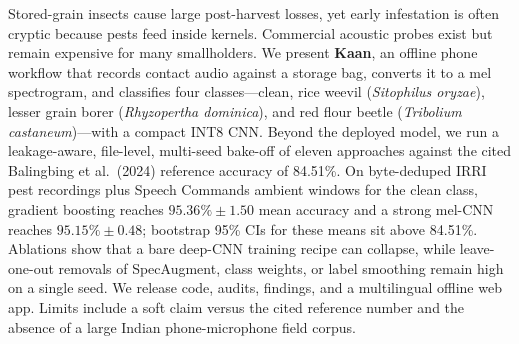 Stored-grain insects cause large post-harvest losses, yet early infestation is often cryptic because pests feed inside kernels.
Commercial acoustic probes exist but remain expensive for many smallholders.
We present \textbf{Kaan}, an offline phone workflow that records contact audio against a storage bag, converts it to a mel spectrogram, and classifies four classes---clean, rice weevil (\textit{Sitophilus oryzae}), lesser grain borer (\textit{Rhyzopertha dominica}), and red flour beetle (\textit{Tribolium castaneum})---with a compact INT8 CNN.
Beyond the deployed model, we run a leakage-aware, file-level, multi-seed bake-off of eleven approaches against the cited Balingbing et al.\ (2024) reference accuracy of 84.51\%.
On byte-deduped IRRI pest recordings plus Speech Commands ambient windows for the clean class, gradient boosting reaches $95.36\%\pm 1.50$ mean accuracy and a strong mel-CNN reaches $95.15\%\pm 0.48$; bootstrap 95\% CIs for these means sit above 84.51\%.
Ablations show that a bare deep-CNN training recipe can collapse, while leave-one-out removals of SpecAugment, class weights, or label smoothing remain high on a single seed.
We release code, audits, findings, and a multilingual offline web app.
Limits include a soft claim versus the cited reference number and the absence of a large Indian phone-microphone field corpus.
